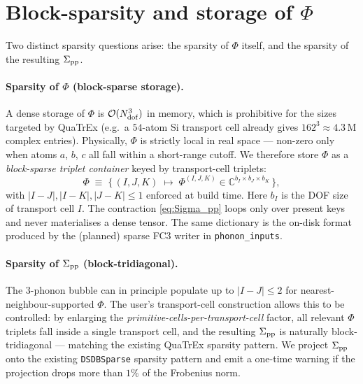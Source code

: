 \section{Block-sparsity and storage of \texorpdfstring{$\Phi$}{Phi}}
\label{sec:phph_block_sparsity}

Two distinct sparsity questions arise: the sparsity of $\Phi$ itself, and
the sparsity of the resulting $\Sigma_{\rm pp}$.

\paragraph{Sparsity of $\Phi$ (block-sparse storage).}
A dense storage of $\Phi$ is
$\mathcal O(N_{\rm dof}^{3})$ in memory, which is prohibitive for the
sizes targeted by QuaTrEx (e.g.\ a $54$-atom Si transport cell already
gives $162^{3}\approx 4.3$\,M complex entries). Physically, $\Phi$ is
strictly local in real space — non-zero only when atoms $a$, $b$, $c$ all
fall within a short-range cutoff. We therefore store $\Phi$ as a
\emph{block-sparse triplet container} keyed by transport-cell triplets:
\begin{equation}\label{eq:phi_blocks}
  \Phi
  \;\equiv\;
  \bigl\{\,(I,J,K)\;\mapsto\;
          \Phi^{(I,J,K)}\in\mathbb C^{b_I\times b_J\times b_K}\,\bigr\},
\end{equation}
with $|I-J|,|I-K|,|J-K|\le 1$ enforced at build time. Here $b_I$ is the
DOF size of transport cell $I$. The contraction
\eqref{eq:Sigma_pp} loops only over present keys and never materialises a
dense tensor. The same dictionary is the on-disk format produced by
the (planned) sparse FC3 writer in \texttt{phonon\_inputs}.

\paragraph{Sparsity of $\Sigma_{\rm pp}$ (block-tridiagonal).}
The 3-phonon bubble can in principle populate up to $|I-J|\le 2$ for
nearest-neighbour-supported $\Phi$. The user's transport-cell
construction allows this to be controlled: by enlarging the
\emph{primitive-cells-per-transport-cell} factor, all relevant $\Phi$
triplets fall inside a single transport cell, and the resulting
$\Sigma_{\rm pp}$ is naturally block-tridiagonal — matching the existing
QuaTrEx sparsity pattern. We project
$\Sigma_{\rm pp}$ onto the existing
\texttt{DSDBSparse} sparsity pattern and emit a one-time warning if the
projection drops more than $1\%$ of the Frobenius norm.

